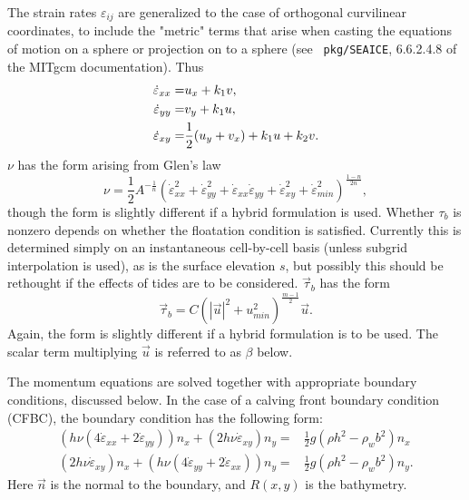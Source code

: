 The strain rates $\varepsilon_{ij}$ are generalized to the case of orthogonal
curvilinear coordinates, to include the "metric" terms that arise when casting
the equations of motion on a sphere or projection on to a sphere (see {\tt
pkg/SEAICE}, 6.6.2.4.8 of the MITgcm documentation). Thus
\begin{align}
 \dot{\varepsilon}_{xx} = & u_x + k_1 v, \notag \\
 \dot{\varepsilon}_{yy} = & v_y + k_1 u, \notag \\ 
 \dot{\varepsilon}_{xy} = & \frac{1}{2}(u_y+v_x) + k_1 u + k_2 v. \notag 
\end{align}
$\nu$ has the form arising from Glen's law
\begin{equation}
 \nu =
\frac{1}{2}A^{-\frac{1}{n}}\left(\dot{\varepsilon}_{xx}^2+\dot{\varepsilon}_{yy}
^2+\dot{\varepsilon}_{xx}\dot{\varepsilon}_{yy}+\dot{\varepsilon}_{xy}^2+\dot{
\varepsilon}_{min}^2\right)^{\frac{1-n}{2n}},
\end{equation}
though the form is slightly different if a hybrid formulation is used. Whether
$\tau_b$ is nonzero depends on whether the floatation condition is satisfied.
Currently this is determined simply on an instantaneous cell-by-cell basis
(unless subgrid interpolation is used), as is the surface elevation $s$, but
possibly this should be rethought if the effects of tides are to be considered.
$\vec{\tau}_b$ has the form
\begin{equation}
\label{eq:sliding_law}
 \vec{\tau}_b = C (|\vec{u}|^2+u_{min}^2)^{\frac{m-1}{2}}\vec{u}.
\end{equation}
Again, the form is slightly different if a hybrid formulation is to be used. The
scalar term multiplying $\vec{u}$ is referred to as $\beta$ below.

The momentum equations are solved together with appropriate boundary conditions,
discussed below. In the case of a calving front boundary condition (CFBC), the
boundary condition has the following form:
\begin{align}
\label{eq:cfbcx}
 (h\nu(4\dot{\varepsilon}_{xx}+2\dot{\varepsilon}_{yy}))n_x +
(2h\nu\dot{\varepsilon}_{xy})n_y = & \frac{1}{2}g \left(\rho h^2 - \rho_w
b^2\right)n_x   \\
\label{eq:cfbcy}  
(2h\nu\dot{\varepsilon}_{xy})n_x +
(h\nu(4\dot{\varepsilon}_{yy}+2\dot{\varepsilon}_{xx}))n_y = & \frac{1}{2}g
\left(\rho h^2 - \rho_w b^2\right)n_y. 
\end{align}
Here $\vec{n}$ is the normal to the boundary, and $R(x,y)$ is the bathymetry.

